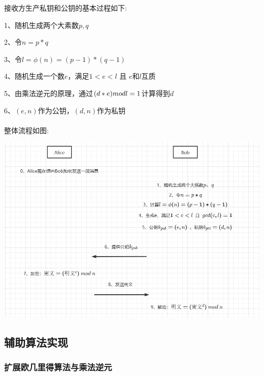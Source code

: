 \documentclass[UTF8,a4paper,10.5pt,twocolumn]{ctexart}
\newcommand{\upcite}[1]{\textsuperscript{\textsuperscript{\cite{#1}}}}
\begin{document}
	\par 接收方生产私钥和公钥的基本过程如下: 
	\par 1、随机生成两个大素数$p,q$
	\par 2、令$n=p*q$
	\par 3、令$l=\phi(n)=(p-1)*(q-1)$
	\par 4、随机生成一个数$e$，满足$1<e<l$  且 $e$和$l$互质
	\par 5、由乘法逆元的原理，通过$(d*e)\space mod\space l=1$计算得到$d$
	\par 6、$(e,n)$作为公钥，$(d,n)$作为私钥

	\par 整体流程\upcite{2}如图:\\
	\centerline{\includegraphics[scale=0.45]{RSA流程.png}} 


\subsection{辅助算法实现}

\subsubsection {扩展欧几里得算法与乘法逆元}
\end{document}
